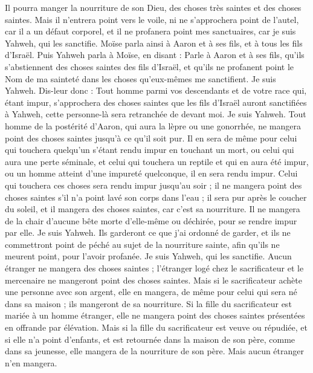 \begin{multicols}{2}
Il pourra manger la nourriture de son Dieu, des choses très saintes et des choses saintes.
Mais il n'entrera point vers le voile, ni ne s'approchera point de l'autel, car il a un défaut corporel, et il ne profanera point mes sanctuaires, car je suis Yahweh, qui les sanctifie.
Moïse parla ainsi à Aaron et à ses fils, et à tous les fils d’Israël.
\VerseOne{}Puis Yahweh parla à Moïse, en disant :
Parle à Aaron et à ses fils, qu’ils s'abstiennent des choses saintes des fils d’Israël, et qu’ils ne profanent point le Nom de ma sainteté dans les choses qu’eux-mêmes me sanctifient. Je suis Yahweh.
Dis-leur donc : Tout homme parmi vos descendants et de votre race qui, étant impur, s'approchera des choses saintes que les fils d'Israël auront sanctifiées à Yahweh, cette personne-là sera retranchée de devant moi. Je suis Yahweh.
Tout homme de la postérité d'Aaron, qui aura la lèpre ou une gonorrhée, ne mangera point des choses saintes jusqu'à ce qu'il soit pur. Il en sera de même pour celui qui touchera quelqu’un s’étant rendu impur en touchant un mort, ou celui qui aura une perte séminale,
et celui qui touchera un reptile et qui en aura été impur, ou un homme atteint d’une impureté quelconque, il en sera rendu impur.
Celui qui touchera ces choses sera rendu impur jusqu'au soir ; il ne mangera point des choses saintes s’il n'a point lavé son corps dans l'eau ;
il sera pur après le coucher du soleil, et il mangera des choses saintes, car c'est sa nourriture.
Il ne mangera de la chair d'aucune bête morte d'elle-même ou déchirée, pour se rendre impur par elle. Je suis Yahweh.
Ils garderont ce que j'ai ordonné de garder, et ils ne commettront point de péché au sujet de la nourriture sainte, afin qu'ils ne meurent point, pour l'avoir profanée. Je suis Yahweh, qui les sanctifie.
Aucun étranger ne mangera des choses saintes ; l’étranger logé chez le sacrificateur et le mercenaire ne mangeront point des choses saintes.
Mais si le sacrificateur achète une personne avec son argent, elle en mangera, de même pour celui qui sera né dans sa maison ; ils mangeront de sa nourriture.
Si la fille du sacrificateur est mariée à un homme étranger, elle ne mangera point des choses saintes présentées en offrande par élévation.
Mais si la fille du sacrificateur est veuve ou répudiée, et si elle n'a point d'enfants, et est retournée dans la maison de son père, comme dans sa jeunesse, elle mangera de la nourriture de son père. Mais aucun étranger n'en mangera.

\end{multicols}
